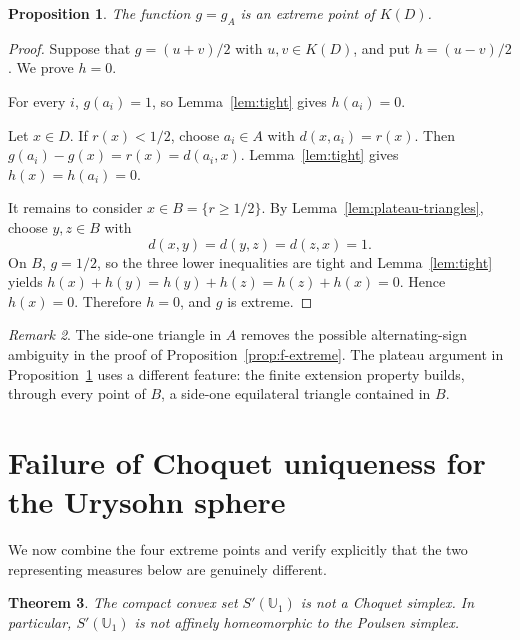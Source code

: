 \documentclass{proc-l}
\numberwithin{equation}{section}
\newtheorem{theorem}{Theorem}[section]
\newtheorem{proposition}[theorem]{Proposition}
\theoremstyle{definition}
\theoremstyle{remark}
\newtheorem{remark}[theorem]{Remark}
\begin{document}
\begin{proposition}\label{prop:g-extreme}
The function \(g=g_A\) is an extreme point of \(K(D)\).
\end{proposition}

\begin{proof}
Suppose that \(g=(u+v)/2\) with \(u,v\in K(D)\), and put \(h=(u-v)/2\).  We
prove \(h=0\).

For every \(i\), \(g(a_i)=1\), so Lemma~\ref{lem:tight} gives
\(h(a_i)=0\).

Let \(x\in D\).  If \(r(x)<1/2\), choose \(a_i\in A\) with
\(d(x,a_i)=r(x)\).  Then \(g(a_i)-g(x)=r(x)=d(a_i,x)\).  Lemma~\ref{lem:tight} gives
\(h(x)=h(a_i)=0\).

It remains to consider \(x\in B=\{r\ge1/2\}\).  By
Lemma~\ref{lem:plateau-triangles}, choose \(y,z\in B\) with
\[
        d(x,y)=d(y,z)=d(z,x)=1.
\]
On \(B\), \(g=1/2\), so the three lower inequalities are tight and
Lemma~\ref{lem:tight} yields
\(h(x)+h(y)=h(y)+h(z)=h(z)+h(x)=0\).  Hence \(h(x)=0\).  Therefore \(h=0\),
and \(g\) is extreme.
\end{proof}

\begin{remark}
The side-one triangle in \(A\) removes the possible alternating-sign ambiguity
in the proof of Proposition~\ref{prop:f-extreme}.  The plateau argument in
Proposition~\ref{prop:g-extreme} uses a different feature: the finite extension property
builds, through every point of \(B\), a side-one equilateral triangle contained
in \(B\).
\end{remark}

\section{Failure of Choquet uniqueness for the Urysohn sphere}
\label{sec:urysohn-non-simplex}

We now combine the four extreme points and verify explicitly that the two
representing measures below are genuinely different.

\begin{theorem}\label{thm:urysohn-main}
The compact convex set \(S'(\mathbb U_1)\) is not a Choquet simplex.  In
particular, \(S'(\mathbb U_1)\) is not affinely homeomorphic to the Poulsen
simplex.
\end{theorem}
\end{document}
